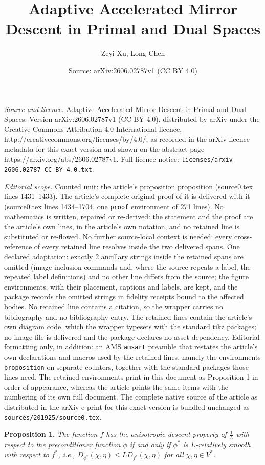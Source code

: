 \documentclass[10pt,a4paper]{amsart}
\title{Adaptive Accelerated Mirror Descent in Primal and Dual Spaces}
\author{Zeyi Xu, Long Chen}
\date{Source: arXiv:2606.02787v1 (CC BY 4.0)}
\newtheorem{proposition}{Proposition}
\begin{document}
\maketitle

\noindent\emph{Source and licence.} Adaptive Accelerated Mirror Descent in Primal and Dual Spaces. Version arXiv:2606.02787v1 (CC BY 4.0), distributed by arXiv under the Creative Commons Attribution 4.0 International licence, http://creativecommons.org/licenses/by/4.0/, as recorded in the arXiv licence metadata for this exact version and shown on the abstract page https://arxiv.org/abs/2606.02787v1. Full licence notice: \texttt{licenses/arxiv-2606.02787-CC-BY-4.0.txt}.\par\smallskip

\noindent\textit{Editorial scope.} Counted unit: the article's proposition proposition (source0.tex lines 1431--1433). The article's complete original proof of it is delivered with it (source0.tex lines 1434--1704, one \texttt{proof} environment of 271 lines). No mathematics is written, repaired or re-derived: the statement and the proof are the article's own lines, in the article's own notation, and no retained line is substituted or re-flowed.  No further source-local context is needed: every cross-reference of every retained line resolves inside the two delivered spans.  One declared adaptation: exactly 2 ancillary strings inside the retained spans are omitted (image-inclusion commands and, where the source repeats a label, the repeated label definitions) and no other line differs from the source; the figure environments, with their placement, captions and labels, are kept, and the package records the omitted strings in fidelity receipts bound to the affected bodies.  No retained line contains a citation, so the wrapper carries no bibliography and no bibliography entry.  The retained lines contain the article's own diagram code, which the wrapper typesets with the standard tikz packages; no image file is delivered and the package declares no asset dependency.  Editorial formatting only, in addition: an AMS \texttt{amsart} preamble that restates the article's own declarations and macros used by the retained lines, namely the environments \texttt{proposition} on separate counters, together with the standard packages those lines need.  The retained environments print in this document as Proposition 1 in order of appearance, whereas the article prints the same items with the numbering of its own full document.  The complete native source of the article as distributed in the arXiv e-print for this exact version is bundled unchanged as \texttt{sources/201925/source0.tex}.
\begin{proposition}
    The function $f$ has the anisotropic descent property of $\frac{1}{L}$ with respect to the preconditioner function $\phi$ if and only if $\phi^*$ is $L$-relatively smooth with respect to $f^*$, i.e., $D_{\phi^*}(\chi, \eta)\leq L D_{f^*}(\chi, \eta)$ for all $\chi, \eta\in V^*$.
\end{proposition}
\end{document}
